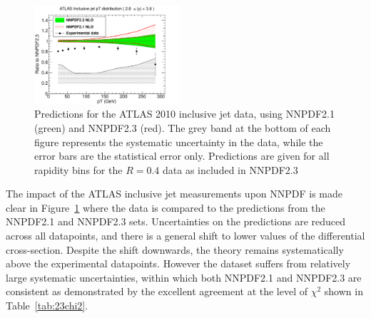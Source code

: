 \begin{figure}[hp]
\includegraphics[width=0.48\textwidth]{6-LHCimpact/figs/ATLASR04JETS36PB_5.pdf}
\caption[Predictions for the ATLAS 2010 inclusive jet data, using NNPDF2.1 and NNPDF2.3]{Predictions for the ATLAS 2010 inclusive jet data, using NNPDF2.1 (green) and NNPDF2.3 (red). The grey band at the bottom of each figure represents the systematic uncertainty in the data, while the error bars are the statistical error only. Predictions are given for all rapidity bins for the $R=0.4$ data as included in NNPDF2.3}
\label{fig:ATLASjetspred}
\end{figure}

The impact of the ATLAS inclusive jet measurements upon NNPDF is made clear in Figure~\ref{fig:ATLASjetspred} where the data is compared to the predictions from the NNPDF2.1 and NNPDF2.3 sets. Uncertainties on the predictions are reduced across all datapoints, and there is a general shift to lower values of the differential cross-section. Despite the shift downwards, the theory remains systematically above the experimental datapoints. However the dataset suffers from relatively large systematic uncertainties, within which both NNPDF2.1 and NNPDF2.3 are consistent as demonstrated by the excellent agreement at the level of $\chi^2$ shown in Table~\ref{tab:23chi2}.

